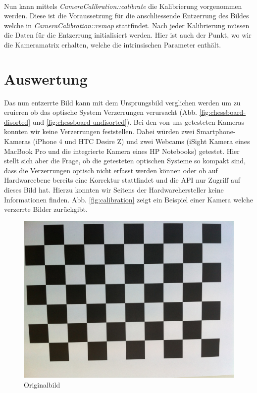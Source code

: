 \paragraph{} Nun kann mittels \textit{CameraCalibration::calibrate} die Kalibrierung vorgenommen werden. Diese ist die Voraussetzung für die anschliessende Entzerrung des Bildes welche in \textit{CameraCalibration::remap} stattfindet. Nach jeder Kalibrierung müssen die Daten für die Entzerrung initialisiert werden. Hier ist auch der Punkt, wo wir die Kameramatrix erhalten, welche die intrinsischen Parameter enthält.

\section{Auswertung} Das nun entzerrte Bild kann mit dem Ursprungsbild verglichen werden um zu eruieren ob das optische System Verzerrungen verursacht (Abb. \ref{fig:chessboard-disorted} und \ref{fig:chessboard-undisorted}). Bei den von uns getesteten Kameras konnten wir keine Verzerrungen feststellen. Dabei würden zwei Smartphone-Kameras (iPhone 4 und HTC Desire Z) und zwei Webcams (iSight Kamera eines MacBook Pro und die integrierte Kamera eines HP Notebooks) getestet. Hier stellt sich aber die Frage, ob die getesteten optischen Systeme so kompakt sind, dass die Verzerrungen optisch nicht erfasst werden können oder ob auf Hardwareebene bereits eine Korrektur stattfindet und die API nur Zugriff auf dieses Bild hat. Hierzu konnten wir Seitens der Hardwarehersteller keine Informationen finden. Abb. \ref{fig:calibration} zeigt ein Beispiel einer Kamera welche verzerrte Bilder zurückgibt.

\begin{figure}[!ht]
\centering
\includegraphics[scale=0.1]{images/chessboard-disorted.jpg} 
\caption{Originalbild}
\label{fig:calib-d}
\end{figure}

